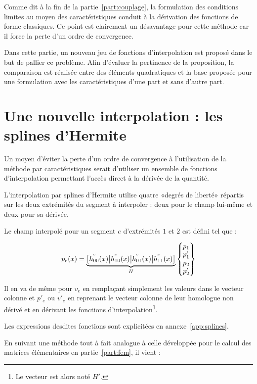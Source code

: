 Comme dit à la fin de la partie~\ref{part:couplage}, la formulation des conditions limites au moyen des
caractéristiques conduit à la dérivation des fonctions de forme classiques. Ce point est clairement un désavantage pour
cette méthode car il force la perte d'un ordre de convergence.

Dans cette partie, un nouveau jeu de fonctions d'interpolation est proposé dans le but de pallier ce problème. Afin
d'évaluer la pertinence de la proposition, la comparaison est réalisée entre des éléments quadratiques et la base
proposée pour une formulation avec les caractéristiques d'une part et sans d'autre part.

\section{Une nouvelle interpolation : les splines d'Hermite}

Un moyen d'éviter la perte d'un ordre de convergence à l'utilisation de la méthode par caractéristiques serait
d'utiliser un ensemble de fonctions d'interpolation permettant l'accès direct à la dérivée de la quantité.

L'interpolation par splines d'Hermite utilise quatre «degrés de liberté» répartis sur les deux extrémités du segment à
interpoler : deux pour le champ lui-même et deux pour sa dérivée.

Le champ interpolé pour un segment $e$ d'extrémités $1$ et $2$ est défini tel que :

\begin{equation*}
	p_e(x) = \underbrace{\left[\tilde{h_{00}}(x)\big|\tilde{h_{10}}(x)\big|\tilde{h_{01}}(x)\big|\tilde{h_{11}}(x)\right]}_{H}\begin{Bmatrix}p_1\\p'_1\\p_2\\p'_2\end{Bmatrix}
\end{equation*}

Il en va de même pour $v_e$ en remplaçant simplement les valeurs dans le vecteur colonne et $p'_e$ ou $v'_e$ en
reprenant le vecteur colonne de leur homologue non dérivé et en dérivant les fonctions d'interpolation\footnote{Le
vecteur est alors noté $H'$.}.

Les expressions desdites fonctions sont explicitées en annexe~\ref{app:splines}.

En suivant une méthode tout à fait analogue à celle développée pour le calcul des matrices élémentaires en partie~\ref{part:fem}, il vient :

